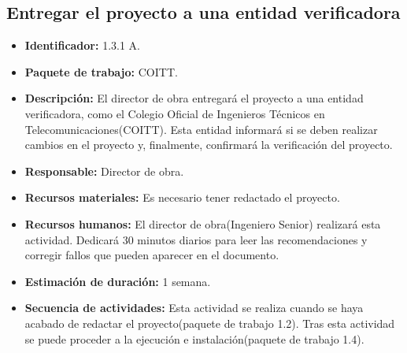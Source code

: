 \subsection{Entregar el proyecto a una entidad verificadora}
\begin{itemize}
\item \textbf{Identificador: }1.3.1 A.
\item \textbf{Paquete de trabajo: }COITT.
\item \textbf{Descripción: }El director de obra entregará el proyecto a una entidad verificadora, como el  Colegio Oficial de Ingenieros Técnicos en Telecomunicaciones(COITT). Esta entidad informará si se deben realizar cambios en el proyecto y, finalmente, confirmará la verificación del proyecto.
\item \textbf{Responsable: }Director de obra.
\item \textbf{Recursos materiales: }Es necesario tener redactado el proyecto.
\item \textbf{Recursos humanos:} El director de obra(Ingeniero Senior) realizará esta actividad. Dedicará 30 minutos diarios para leer las recomendaciones y corregir fallos que pueden aparecer en el documento.
\item \textbf{Estimación de duración: }1 semana.
\item \textbf{Secuencia de actividades: }Esta actividad se realiza cuando se haya acabado de redactar el proyecto(paquete de trabajo 1.2). Tras esta actividad se puede proceder a la ejecución e instalación(paquete de trabajo 1.4).
\end{itemize}

